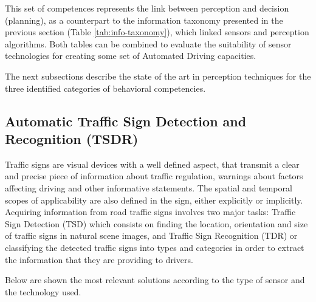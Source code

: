 \documentclass[journal]{IEEEtran}
\begin{document}
This set of competences represents the link between perception and decision
(planning), as a counterpart to the information taxonomy presented in the
previous section (Table \ref{tab:info-taxonomy}), which linked sensors and 
perception algorithms. 
Both tables can be combined to evaluate the suitability of sensor technologies
for creating some set of Automated Driving capacities.

The next subsections describe the state of the art in perception techniques for
the three identified categories of behavioral competencies.

\subsection{Automatic Traffic Sign Detection and Recognition (TSDR)} 
Traffic signs are visual devices with a well defined aspect, that transmit a 
clear and precise piece of information about traffic regulation, warnings about
factors affecting driving and other informative statements. The spatial and
temporal scopes of applicability are also defined in the sign, either 
explicitly or implicitly.
Acquiring information from road traffic signs involves two major tasks: 
Traffic Sign Detection (TSD) which consists on finding the location, 
orientation and size of traffic signs in natural scene images, and Traffic Sign 
Recognition (TDR) or classifying the detected traffic signs into types 
and categories in order to extract the information that they are providing to 
drivers.

Below are shown the most relevant solutions according to the type of sensor 
and the technology used.
\end{document}
